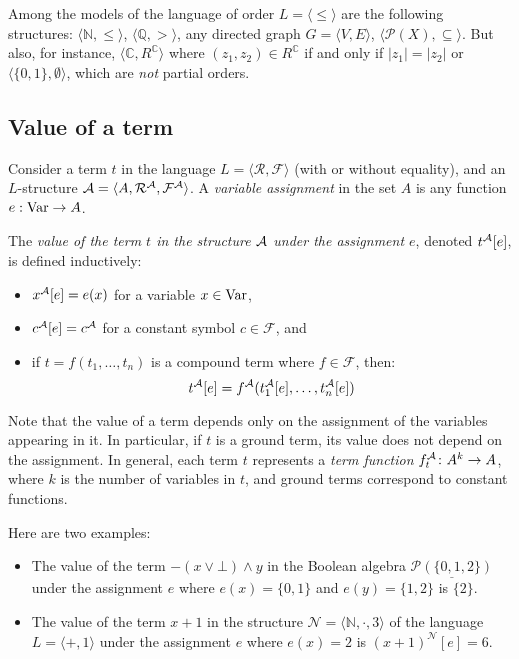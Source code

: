 \begin{example}
    Among the models of the language of order $L=\langle \leq \rangle$ are the following structures: $\langle \mathbb N,\leq\rangle$, $\langle \mathbb Q, > \rangle$, any directed graph $G=\langle V,E\rangle$, $\langle \mathcal P(X),\subseteq\rangle$. But also, for instance, $\langle \mathbb C,R^\mathbb C\rangle$ where $(z_1,z_2)\in R^\mathbb C$ if and only if $|z_1|=|z_2|$ or $\langle \{0,1\},\emptyset\rangle$, which are \emph{not} partial orders.
\end{example}

\subsection{Value of a term}

Consider a term $t$ in the language $L=\langle \mathcal R,\mathcal F\rangle$ (with or without equality), and an $L$-structure $\mathcal{A}=\langle A,\mathcal R^{\mathcal{A}},\mathcal F^{\mathcal{A}}\rangle$. A \emph{variable assignment} in the set $A$ is any function $e:\operatorname{Var}\to A$.

\begin{definition}
    The \emph{value of the term $t$ in the structure $\mathcal{A}$ under the assignment $e$}, denoted $t^{\mathcal{A}}[e]$, is defined inductively:
    \begin{itemize}
        \item $x^{\mathcal{A}}[e]=e(x)$ for a variable $x\in\operatorname{Var}$,
        \item $c^{\mathcal{A}}[e]=c^{\mathcal{A}}$ for a constant symbol $c\in\mathcal F$, and
        \item if $t=f(t_1,\dots,t_n)$ is a compound term where $f\in\mathcal F$, then:
        $$
        t^{\mathcal{A}}[e]=f^{\mathcal{A}}(t_1^{\mathcal{A}}[e],\dots,t_n^{\mathcal{A}}[e])
        $$
    \end{itemize}
\end{definition}

\begin{remark}
    Note that the value of a term depends only on the assignment of the variables appearing in it. In particular, if $t$ is a ground term, its value does not depend on the assignment.
    In general, each term $t$ represents a \emph{term function} $f_t^{\mathcal{A}}\colon A^k\to A$, where $k$ is the number of variables in $t$, and ground terms correspond to constant functions.
\end{remark}

\begin{example}
    Here are two examples:
    \begin{itemize}
        \item The value of the term $-(x\lor \bot)\land y$ in the Boolean algebra $\underline{\mathcal P(\{0,1,2\})}$ under the assignment $e$ where $e(x)=\{0,1\}$ and $e(y)=\{1,2\}$ is $\{2\}$.
        \item The value of the term $x+1$ in the structure $\mathcal N=\langle\mathbb N,\cdot,3\rangle$ of the language $L=\langle +,1\rangle$ under the assignment $e$ where $e(x)=2$ is $(x+1)^\mathcal N[e]=6$.
    \end{itemize}
\end{example}

